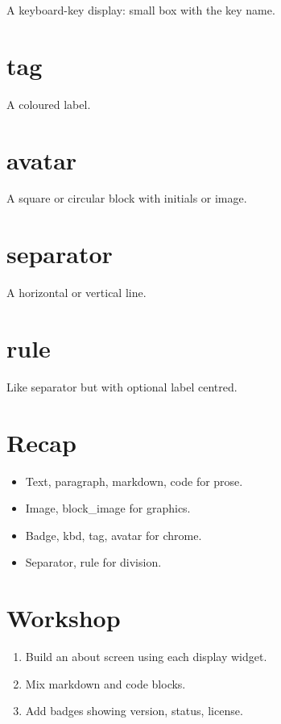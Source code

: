A keyboard-key display: small box with the key name.

\section{tag}

A coloured label.

\section{avatar}

A square or circular block with initials or image.

\section{separator}

A horizontal or vertical line.

\section{rule}

Like separator but with optional label centred.

\section{Recap}

\begin{recap}
\begin{itemize}[leftmargin=*]
  \item Text, paragraph, markdown, code for prose.
  \item Image, block\_image for graphics.
  \item Badge, kbd, tag, avatar for chrome.
  \item Separator, rule for division.
\end{itemize}
\end{recap}

\section*{Workshop}

\begin{enumerate}[leftmargin=*]
  \item Build an about screen using each display widget.
  \item Mix markdown and code blocks.
  \item Add badges showing version, status, license.
\end{enumerate}
